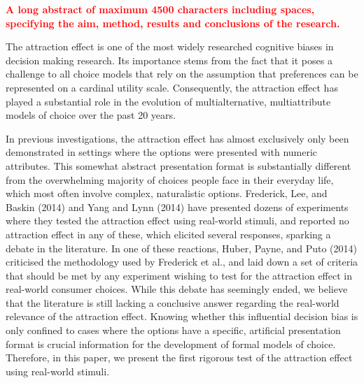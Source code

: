 \documentclass[12pt, a4paper]{article}
\begin{document}
\textcolor{red}{\textbf{A long abstract of maximum 4500 characters including spaces, specifying the aim, method, results and conclusions of the research.}}

The attraction effect is one of the most widely researched cognitive biases in decision making research. Its importance stems from the fact that it poses a challenge to all choice models that rely on the assumption that preferences can be represented on a cardinal utility scale. Consequently, the attraction effect has played a substantial role in the evolution of multialternative, multiattribute models of choice over the past 20 years.



In previous investigations, the attraction effect has almost exclusively only been demonstrated in settings where the options were presented with numeric attributes. This somewhat abstract presentation format is substantially different from the overwhelming majority of choices people face in their everyday life, which most often involve complex, naturalistic options. Frederick, Lee, and Baskin (2014) and Yang and Lynn (2014) have presented dozens of experiments where they tested the attraction effect using real-world stimuli, and reported no attraction effect in any of these, which elicited several responses, sparking a debate in the literature. In one of these reactions, Huber, Payne, and Puto (2014) criticised the methodology used by Frederick et al., and laid down a set of criteria that should be met by any experiment wishing to test for the attraction effect in real-world consumer choices. While this debate has seemingly ended, we believe that the literature is still lacking a conclusive answer regarding the real-world relevance of the attraction effect. Knowing whether this influential decision bias is only confined to cases where the options have a specific, artificial presentation format is crucial information for the development of formal models of choice. Therefore, in this paper, we present the first rigorous test of the attraction effect using real-world stimuli.
\end{document}
